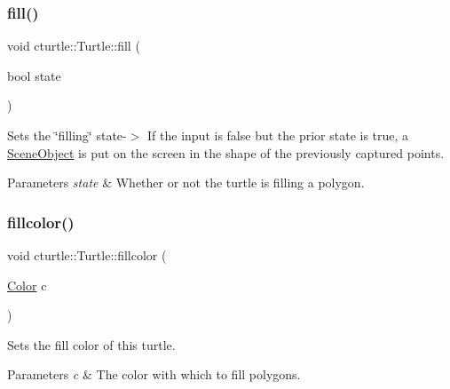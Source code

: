 \subsubsection{\texorpdfstring{fill()}{fill()}}
{\footnotesize\ttfamily void cturtle\+::\+Turtle\+::fill (\begin{DoxyParamCaption}\item[{bool}]{state }\end{DoxyParamCaption})}



Sets the \char`\"{}filling\char`\"{} state-\/$>$ If the input is false but the prior state is true, a \hyperlink{structcturtle_1_1SceneObject}{Scene\+Object} is put on the screen in the shape of the previously captured points. 


\begin{DoxyParams}{Parameters}
{\em state} & Whether or not the turtle is filling a polygon. \\
\hline
\end{DoxyParams}
\mbox{\label{classcturtle_1_1Turtle_a222a95d61c5cfee661f5244e51d57539}} 
\subsubsection{\texorpdfstring{fillcolor()}{fillcolor()}\hspace{0.1cm}{\footnotesize\ttfamily [1/2]}}
{\footnotesize\ttfamily void cturtle\+::\+Turtle\+::fillcolor (\begin{DoxyParamCaption}\item[{\hyperlink{classcturtle_1_1Color}{Color}}]{c }\end{DoxyParamCaption})\hspace{0.3cm}{\ttfamily [inline]}}



Sets the fill color of this turtle. 


\begin{DoxyParams}{Parameters}
{\em c} & The color with which to fill polygons. \\
\hline
\end{DoxyParams}
\mbox{\label{classcturtle_1_1Turtle_aa35fb43f969187b513d5a1f443e98569}} 
